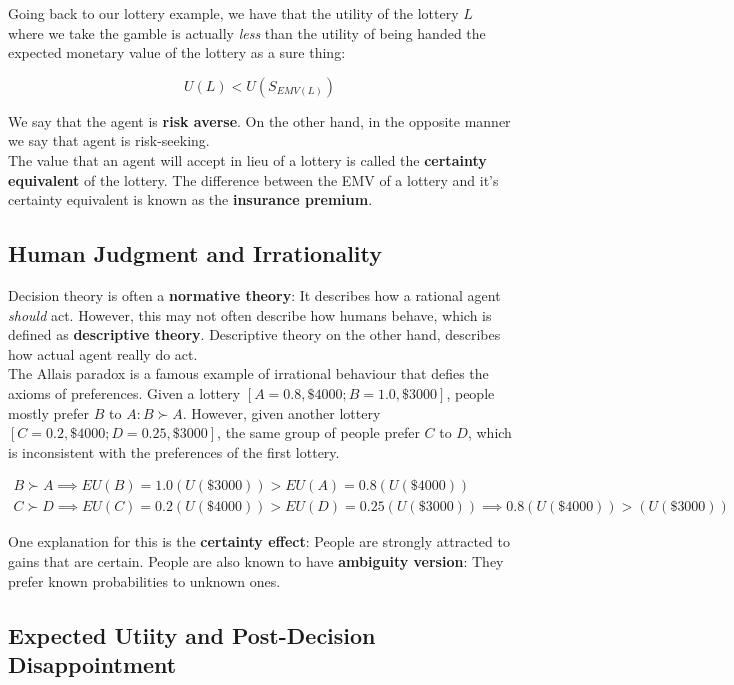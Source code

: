 \documentclass[11pt]{article}
\begin{document}
Going back to our lottery example, we have that the utility of the lottery $L$ where we take the gamble is actually \textit{less} than the utility of being handed the expected monetary value of the lottery as a sure thing:

$$
U(L) < U(S_{EMV(L)})
$$

We say that the agent is \textbf{risk averse}. On the other hand, in the opposite manner we say that agent is risk-seeking.\\

The value that an agent will accept in lieu of a lottery is called the \textbf{certainty equivalent} of the lottery. The difference between the EMV of a lottery and it's certainty equivalent is known as the \textbf{insurance premium}.

\subsection{Human Judgment and Irrationality}

Decision theory is often a \textbf{normative theory}: It describes how a rational agent\textit{ should} act. However, this may not often describe how humans behave, which is defined as \textbf{descriptive theory}. Descriptive theory on the other hand, describes how actual agent really do act.\\

The Allais paradox is a famous example of irrational behaviour that defies the axioms of preferences. Given a lottery $[A = 0.8, \$ 4000; B = 1.0, \$ 3000]$, people mostly prefer $B$ to $A: B \succ A$. However, given another lottery $[C = 0.2, \$ 4000; D = 0.25, \$ 3000]$, the same group of people prefer $C$ to $D$, which is inconsistent with the preferences of the first lottery.

$$
\begin{gathered}
B \succ A \implies EU(B) = 1.0(U(\$3000)) > EU(A) = 0.8 (U(\$ 4000))\\
C \succ D \implies EU(C) = 0.2(U(\$ 4000)) > EU(D) =  0.25(U(\$3000)) \implies 0.8 (U(\$ 4000)) > (U(\$3000))
\end{gathered}
$$

One explanation for this is the \textbf{certainty effect}: People are strongly attracted to gains that are certain. People are also known to have \textbf{ambiguity version}: They prefer known probabilities to unknown ones.

\subsection{Expected Utiity and Post-Decision Disappointment}
\end{document}
